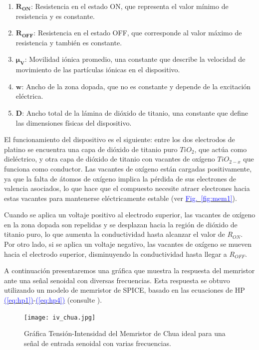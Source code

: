 \documentclass[12pt,a4paper]{report} %
\newcommand{\fref}[1]{\hyperref[#1]{\textcolor{blue}{Fig.~\ref*{#1}}}}
\newcommand{\eref}[1]{\hyperref[#1]{\textcolor{blue}{(\ref*{#1})}}}
\newcommand{\fref}[1]{\hyperref[#1]{\textcolor{blue}{\textit{Fig.~\ref*{#1}}}}}
\newcommand{\eref}[1]{\hyperref[#1]{\textcolor{blue}{\textit{(\ref*{#1})}}}}
\begin{document}
	\begin{enumerate}
		\item $\bm{R_{ON}}$: Resistencia en el estado ON, que representa el valor mínimo de resistencia y es constante.
		\item $\bm{R_{OFF}}$: Resistencia en el estado OFF, que corresponde al valor máximo de resistencia y también es constante.
		\item $\bm{\mu_V}$: Movilidad iónica promedio, una constante que describe la velocidad de movimiento de las partículas iónicas en el dispositivo.
		\item $\bm{w}$: Ancho de la zona dopada, que no es constante y depende de la excitación eléctrica.
		\item $\bm{D}$: Ancho total de la lámina de dióxido de titanio, una constante que define las dimensiones físicas del dispositivo.
	\end{enumerate}\smallskip
	
	El funcionamiento del dispositivo es el siguiente: entre los dos electrodos de platino se encuentra una capa de dióxido de titanio puro $TiO_2$, que actúa como dieléctrico, y otra capa de dióxido de titanio con vacantes de oxígeno $TiO_{2-x}$ que funciona como conductor. Las vacantes de oxígeno están cargadas positivamente, ya que la falta de átomos de oxígeno implica la pérdida de sus electrones de valencia asociados, lo que hace que el compuesto necesite atraer electrones hacia estas vacantes para mantenerse eléctricamente estable (ver \fref{fig:mem1}).
	
	\vspace{0.5cm} Cuando se aplica un voltaje positivo al electrodo superior, las vacantes de oxígeno en la zona dopada son repelidas y se desplazan hacia la región de dióxido de titanio puro, lo que aumenta la conductividad hasta alcanzar el valor de $R_{ON}$. Por otro lado, si se aplica un voltaje negativo, las vacantes de oxígeno se mueven hacia el electrodo superior, disminuyendo la conductividad hasta llegar a $R_{OFF}$.

	 \vspace{0.5cm}A continuación presentaremos una gráfica que muestra la respuesta del memristor ante una señal senoidal con diversas frecuencias. Esta respuesta se obtuvo utilizando un modelo de memristor de SPICE, basado en las ecuaciones de HP \eref{eq:hp1}-\eref{eq:hp4} (consulte \cite{biolek}).
	
	\newpage 
	
		\vspace{0.5cm}\begin{figure}[h]
		\centering
		\texttt{[image: iv\_chua.jpg]}
		\caption{Gráfica Tensión-Intensidad del Memristor de Chua ideal para una señal de entrada senoidal con varias frecuencias.}
		\label{fig:iv_chua}
	\end{figure}\smallskip
		
\end{document}
